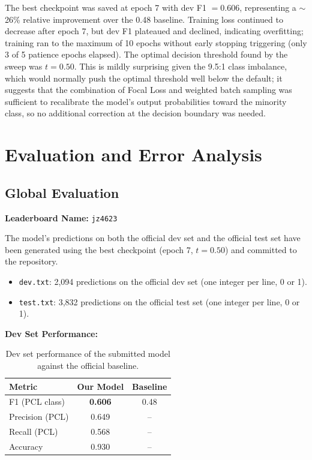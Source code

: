 \documentclass[11pt,a4paper]{article}
\begin{document}
The best checkpoint was saved at epoch 7 with dev F1 $= 0.606$, representing a $\sim$26\% relative improvement over the 0.48 baseline. Training loss continued to decrease after epoch 7, but dev F1 plateaued and declined, indicating overfitting; training ran to the maximum of 10 epochs without early stopping triggering (only 3 of 5 patience epochs elapsed). The optimal decision threshold found by the sweep was $t = 0.50$. This is mildly surprising given the 9.5:1 class imbalance, which would normally push the optimal threshold well below the default; it suggests that the combination of Focal Loss and weighted batch sampling was sufficient to recalibrate the model's output probabilities toward the minority class, so no additional correction at the decision boundary was needed.

\newpage
\section{Evaluation and Error Analysis}

\subsection{Global Evaluation}

\noindent\textbf{Leaderboard Name:} \texttt{jz4623}

\bigskip
The model's predictions on both the official dev set and the official test set have been generated using the best checkpoint (epoch 7, $t = 0.50$) and committed to the repository.

\begin{itemize}[noitemsep]
    \item \texttt{dev.txt}: 2,094 predictions on the official dev set (one integer per line, 0 or 1).
    \item \texttt{test.txt}: 3,832 predictions on the official test set (one integer per line, 0 or 1).
\end{itemize}

\noindent\textbf{Dev Set Performance:}

\begin{table}[H]
    \centering
    \begin{tabular}{lcc}
        \toprule
        \textbf{Metric} & \textbf{Our Model} & \textbf{Baseline} \\
        \midrule
        F1 (PCL class)  & \textbf{0.606}     & 0.48              \\
        Precision (PCL) & 0.649              & --                \\
        Recall (PCL)    & 0.568              & --                \\
        Accuracy        & 0.930              & --                \\
        \bottomrule
    \end{tabular}
    \caption{Dev set performance of the submitted model against the official baseline.}
    \label{tab:global}
\end{table}
\end{document}
